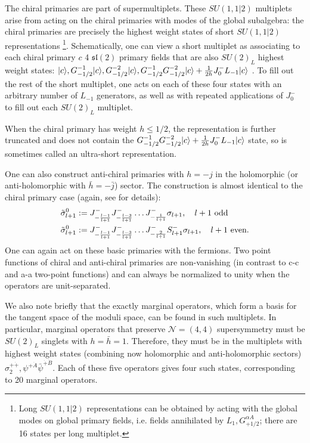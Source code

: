 \documentclass[11pt]{amsart}
\newcommand{\mc}{\mathcal}
\theoremstyle{thm}
\numberwithin{equation}{subsection}
\theoremstyle{def}
\theoremstyle{rem}
\begin{document}
The chiral primaries are part of supermultiplets. These $SU(1,1|2)$ multiplets arise from acting on the chiral primaries with modes of the global subalgebra: the chiral primaries are precisely the highest weight states of short $SU(1,1|2)$ representations \footnote{Long $SU(1,1|2)$ representations can be obtained by acting with the global modes on global primary fields, i.e. fields annihilated by $L_1, G^{\alpha A}_{+1/2}$; there are 16 states per long multiplet.}. Schematically, one can view a short multiplet as associating to each chiral primary $c$ 4 $\mathfrak{sl}(2)$ primary fields that are also $SU(2)_L$ highest weight states: $|c \rangle, G^{- 1}_{-1/2}|c \rangle, G^{-2}_{-1/2}|c \rangle,  \\
G^{-1}_{-1/2}G^{-2}_{-1/2}|c \rangle + {1 \over 2h}J^-_0 L_{-1}|c\rangle$ . To fill out the rest of the short multiplet, one acts on each of these four states with an arbitrary number of $L_{-1}$ generators, as well as with repeated applications of $J_0^-$ to fill out each $SU(2)_L$ multiplet. 

When the chiral primary has weight $h \leq 1/2$, the representation is further truncated and does not contain the $G^{-1}_{-1/2}G^{-2}_{-1/2}|c \rangle + {1 \over 2h}J^-_0 L_{-1}|c\rangle$ state, so is sometimes called an ultra-short representation. 

One can also construct anti-chiral primaries with $h=-j$ in the holomorphic (or anti-holomorphic with $\bar{h}=-\bar{j}$) sector. The construction is almost identical to the chiral primary case (again, see \cite{LuninMathur} for details):
\begin{align*}
\tilde{\sigma}^0_{l+1}&:=  J^-_{-{l-1 \over l+1}}J^{-}_{-{l-3 \over l+1}} \ldots J^-_{-{1 \over l+1}}\sigma_{l+1}, \ \ \ l+1 \text { odd} \\
\tilde{\sigma}^0_{l+1}&:= J^-_{-{l-1 \over l+1}}J^{-}_{-{l-3 \over l+1}} \ldots J^-_{-{2 \over l+1}}S^-_{l+1}\sigma_{l+1}, \ \ \ l+1 \text { even}.
\end{align*} One can again act on these basic primaries with the fermions. Two point functions of chiral and anti-chiral primaries are non-vanishing (in contrast to c-c and a-a two-point functions) and can always be normalized to unity when the operators are unit-separated.

We also note briefly that the exactly marginal operators, which form a basis for the tangent space of the moduli space, can be found in such multiplets. In particular, marginal operators that preserve $\mc{N}=(4,4)$ supersymmetry must be $SU(2)_L$ singlets with $h=\bar{h}=1$. Therefore, they must be in the multiplets with highest weight states (combining now holomorphic and anti-holomorphic sectors) $\sigma^{+ \dot{+} }_{2}, \psi^{+\dot{A}}\bar{\psi}^{\dot{+}\dot{B}}$. Each of these five operators gives four such states, corresponding to 20 marginal operators.
\end{document}
